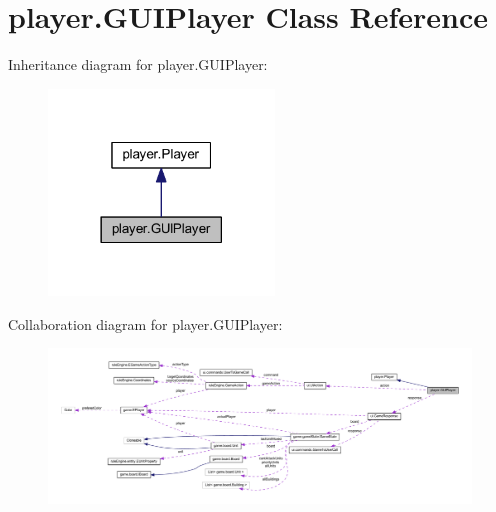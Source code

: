 \hypertarget{classplayer_1_1_g_u_i_player}{}\section{player.\+G\+U\+I\+Player Class Reference}
\label{classplayer_1_1_g_u_i_player}


Inheritance diagram for player.\+G\+U\+I\+Player\+:
\nopagebreak
\begin{figure}[H]
\begin{center}
\leavevmode
\includegraphics[width=170pt]{classplayer_1_1_g_u_i_player__inherit__graph}
\end{center}
\end{figure}


Collaboration diagram for player.\+G\+U\+I\+Player\+:
\nopagebreak
\begin{figure}[H]
\begin{center}
\leavevmode
\includegraphics[width=350pt]{classplayer_1_1_g_u_i_player__coll__graph}
\end{center}
\end{figure}
